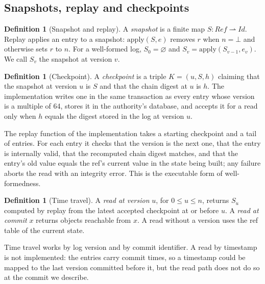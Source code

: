 \documentclass[11pt,letterpaper]{article}
\theoremstyle{definition}
\newtheorem{definition}[theorem]{Definition}
\theoremstyle{remark}
\newcommand{\Snap}[1]{S_{#1}}
\begin{document}
\subsection{Snapshots, replay and checkpoints}

\begin{definition}[Snapshot and replay]
\label{def:tlsc:snapshot}
A \emph{snapshot} is a finite map $S:\mathit{Ref}\rightharpoonup\mathit{Id}$. Replay applies an entry to a snapshot: $\mathrm{apply}(S,e)$ removes $r$ when $n=\bot$ and otherwise sets $r$ to $n$. For a well-formed log, $\Snap{0}=\varnothing$ and $\Snap{v}=\mathrm{apply}(\Snap{v-1},e_v)$. We call $\Snap{v}$ the snapshot at version $v$.
\end{definition}

\begin{definition}[Checkpoint]
\label{def:tlsc:checkpoint}
A \emph{checkpoint} is a triple $K=(u,S,h)$ claiming that the snapshot at version $u$ is $S$ and that the chain digest at $u$ is $h$. The implementation writes one in the same transaction as every entry whose version is a multiple of 64, stores it in the authority's database, and accepts it for a read only when $h$ equals the digest stored in the log at version $u$. %
\end{definition}

The replay function of the implementation takes a starting checkpoint and a tail of entries. For each entry it checks that the version is the next one, that the entry is internally valid, that the recomputed chain digest matches, and that the entry's old value equals the ref's current value in the state being built; any failure aborts the read with an integrity error. This is the executable form of well-formedness.

\begin{definition}[Time travel]
\label{def:tlsc:timetravel}
A \emph{read at version} $u$, for $0\leq u\leq n$, returns $\Snap{u}$ computed by replay from the latest accepted checkpoint at or before $u$. A \emph{read at commit} $x$ returns objects reachable from $x$. A read without a version uses the ref table of the current state.
\end{definition}

Time travel works by log version and by commit identifier. A read by timestamp is not implemented: the entries carry commit times, so a timestamp could be mapped to the last version committed before it, but the read path does not do so at the commit we describe.
\end{document}
